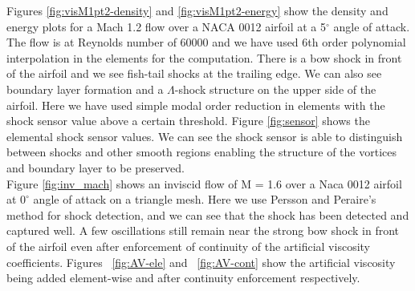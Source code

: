  Figures \ref{fig:visM1pt2-density} and \ref{fig:visM1pt2-energy} show the density and energy plots for a Mach 1.2 flow over a NACA 0012 airfoil at a 5$^{\circ}$ angle of attack. The flow is at Reynolds number of 60000 and we have used 6th order polynomial interpolation in the elements for the computation. There is a bow shock in front of the airfoil and we see fish-tail shocks at the trailing edge. We can also see boundary layer formation and a $\Lambda$-shock structure on the upper side of the airfoil. Here we have used simple modal order reduction in elements with the shock sensor value above a certain threshold. Figure \ref{fig:sensor} shows the elemental shock sensor values. We can see the shock sensor is able to distinguish between shocks and other smooth regions enabling the structure of the vortices and boundary layer to be preserved. \\
 
 Figure \ref{fig:inv_mach} shows an inviscid flow of M = 1.6 over a Naca 0012 airfoil at $0^{\circ}$ angle of attack on a triangle mesh. Here we use Persson and Peraire's method  for shock detection, and we can see that the shock has been detected and captured well. A few oscillations still remain near the strong bow shock in front of the airfoil even after enforcement of continuity of the artificial viscosity coefficients. Figures ~\ref{fig:AV-ele} and ~\ref{fig:AV-cont} show the artificial viscosity being added element-wise and after continuity enforcement respectively.

